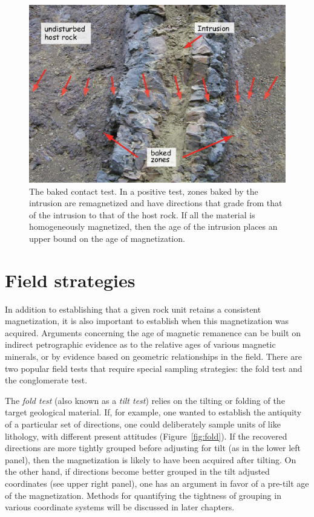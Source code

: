 \begin{figure}[htb]
\centering  \includegraphics[width= 9 cm]{EPSfiles/baked.eps}
\caption{The baked contact test.  In a positive test, 
zones baked by the intrusion are remagnetized and have directions that
grade from that of the intrusion to that of the host rock.
If all the material is homogeneously magnetized,
then the age of the intrusion places an upper bound on the age of
magnetization.}
\label{fig:baked}
\end{figure}


\section{Field strategies}

In addition to establishing that a given rock unit
 retains a consistent magnetization, it is also important
to establish when this magnetization was acquired.  Arguments concerning the age of magnetic remanence can be
built on indirect petrographic evidence as to the relative ages of various magnetic minerals, or by evidence
based on geometric relationships in the field.
  There are two popular  field tests that require special sampling
strategies: the fold test and the conglomerate test.

The
 {\it fold test} (also known as a {\it tilt test})  relies on the tilting or folding of the 
target geological material.
 If, for example, one wanted to establish the
antiquity of a particular set of directions, one could deliberately
sample units of like lithology, with different present attitudes 
(Figure~\ref{fig:fold}).  If the recovered directions are more tightly
grouped before  adjusting for tilt (as in the
lower left panel), then the
magnetization is likely to have been acquired after tilting.  On the other hand, if
directions become better grouped in the tilt adjusted coordinates (see upper right panel),
 one
has an argument in favor of a pre-tilt age of the magnetization.  
Methods for quantifying the tightness of grouping in various coordinate
systems will be discussed in  later chapters.



